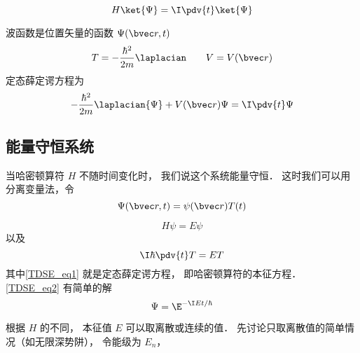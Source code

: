
\begin{issues}
\issueDraft
\issueAbstract
\end{issues}


\begin{equation}
H \ket{\Psi} = \I \pdv{t} \ket{\Psi}
\end{equation}


波函数是位置矢量的函数 $\Psi(\bvec r, t)$
\begin{equation}
T = -\frac{\hbar^2}{2m} \laplacian \qquad V = V(\bvec r)
\end{equation}
定态薛定谔方程为
\begin{equation}
-\frac{\hbar^2}{2m} \laplacian {\Psi} + V(\bvec r)\Psi = \I \pdv{t} \Psi
\end{equation}

\subsection{能量守恒系统}
当哈密顿算符 $H$ 不随时间变化时， 我们说这个系统能量守恒． 这时我们可以用分离变量法，令
\begin{equation}
\Psi(\bvec r, t) = \psi(\bvec r) T(t)
\end{equation}
 
\begin{equation}\label{TDSE_eq1}
H\psi = E\psi
\end{equation}
以及
\begin{equation}\label{TDSE_eq2}
\I \hbar\pdv{t}T = ET
\end{equation}
其中\autoref{TDSE_eq1} 就是定态薛定谔方程， 即哈密顿算符的本征方程． \autoref{TDSE_eq2} 有简单的解
\begin{equation}
\Psi = \E^{-\I E t/\hbar}
\end{equation}


根据 $H$ 的不同， 本征值 $E$ 可以取离散或连续的值． 先讨论只取离散值的简单情况（如无限深势阱）， 令能级为 $E_n$， 
